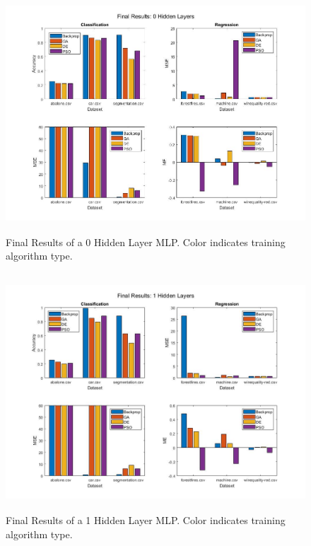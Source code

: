 \documentclass[twoside,11pt]{article}
\begin{document}
	\begin{figure}[h]
		\centering
		\includegraphics[height=3.5in]{FINAL_FIGS/0_hl.jpg}
		\caption{Final Results of a 0 Hidden Layer MLP. Color indicates training algorithm type.}
		\label{0-hl}
	\end{figure}

	\begin{figure}[h]
		\centering
		\includegraphics[height=3.5in]{FINAL_FIGS/1_hl.jpg}
		\caption{Final Results of a 1 Hidden Layer MLP. Color indicates training algorithm type.}
		\label{1-hl}
	\end{figure}
\end{document}
